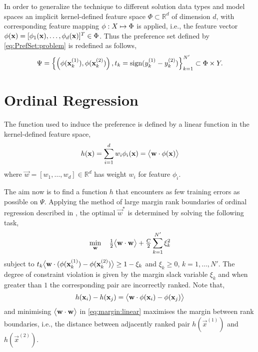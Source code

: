 In order to generalize the technique to different solution data types and model 
spaces an implicit kernel-defined feature space $\Phi\subset\mathbb{R}^d$ of 
dimension $d$, with corresponding feature mapping ${\mathbf{\phi}}:X\mapsto\Phi$ is 
applied, i.e., the feature vector 
${\mathbf{\phi}}(\mathbf{x})=[\phi_1(\mathbf{x}),\ldots,\phi_d(\mathbf{x})]^T\in\Phi$. Thus the 
preference set defined by \cref{eq:PrefSet:problem} is redefined as follows,
\begin{equation}\label{eq:PrefSet:feat}
	\Psi = \left\{\left(\vphi(\vec{x}_k^{(1)}), 
	\vphi(\vec{x}_k^{(2)})\right),t_k=\text{sign}(y_k^{(1)} - 
	y_k^{(2)})\right\}_{k=1}^{N'} \subset \Phi \times Y.
\end{equation}


\section{Ordinal Regression}\label{sec:ord:linpref}
The function used to induce the preference is defined by a linear function in the kernel-defined feature space,
\begin{equation}\label{eq:pref:kernel} 
  h(\vec{x}) = \sum_{i=1}^d w_i\phi_i(\vec{x})=\inner{\vec{w}}{\vphi(\vec{x})} 
\end{equation}
where $\vec{w}=[w_1,\ldots,w_d]\in\mathbb{R}^d$ has weight $w_i$ for feature $\phi_i$.

The aim now is to find a function $h$ that encounters as few training errors as 
possible on $\Psi$. Applying the method of large margin rank boundaries of 
ordinal regression described in \cite{Herbrich00}, the optimal $\vec{w}^*$ is 
determined by solving the following task, 
\begin{equation}\label{eq:margin:linear}
	\min_{\vec{w}}\quad \tfrac{1}{2}\inner{\vec{w}}{\vec{w}} + \tfrac{C}{2}\sum_{k=1}^{N'}\xi_k^2
\end{equation}
subject to $t_k\big<{\mathbf{w}}\cdot{({\mathbf{\phi}}(\mathbf{x}_k^{(1)})-{\mathbf{\phi}}(\mathbf{x}_k^{(2)})}\big>\ge 1 - \xi_k$ and $\xi_k \ge 0$, $k = 1,\ldots, N'$. The degree of constraint violation is given by the margin slack variable $\xi_k$ and when greater than $1$ the corresponding pair are incorrectly ranked. 
Note that,
\begin{equation}\label{eq:hfun}
	h(\vec{x}_i)-h(\vec{x}_j)=\inner{\vec{w}}{\vphi(\vec{x}_i)-\vphi(\vec{x}_j)}
\end{equation}
and minimising $\big<{\mathbf{w}}\cdot{\mathbf{w}}\big>$ in \cref{eq:margin:linear} maximises 
the margin between rank boundaries, i.e., the distance between adjacently 
ranked pair $h(\vec{x}^{(1)})$ and $h(\vec{x}^{(2)})$.

